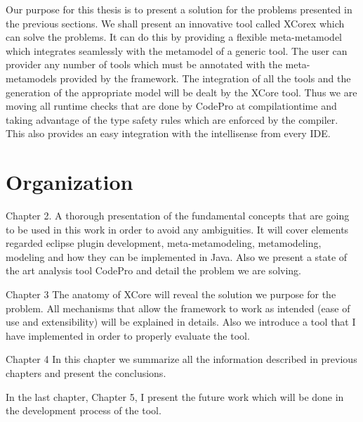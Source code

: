 	Our purpose for this thesis is to present a solution for the problems presented
in the previous sections.  We shall present an innovative tool called XCorex
which can solve the problems. It can do this by providing a flexible meta-metamodel 
which integrates seamlessly with the metamodel of a generic tool. The user can
provider any number of tools which must be annotated with the meta-metamodels 
provided by the framework. The integration of all the tools and
the generation of the appropriate model will be dealt by the XCore tool. Thus we
are moving all runtime checks that are done by CodePro at compilationtime and
taking advantage of the type safety rules which are enforced by the compiler. 
This also provides an easy integration with the intellisense from every IDE.

	
	


\section {Organization}
	Chapter 2.  A thorough presentation of the fundamental concepts that are going
to be used in this work in order to avoid any ambiguities.	It will cover
elements regarded eclipse plugin development, meta-metamodeling, metamodeling,
modeling and how they can be implemented in Java. Also we present a state of the
art analysis tool CodePro and detail the problem we are solving.

	Chapter 3  The anatomy of XCore will reveal the solution we purpose for the 
problem. All mechanisms that allow the framework to work as intended (ease of
use and extensibility) will be explained in details.  Also we introduce a tool
that I have implemented in order to properly evaluate the tool.
	
	Chapter 4  In this chapter we summarize all the information described in
previous chapters and present the conclusions.
	
	In the last chapter, Chapter 5, I present the future work which will be done
in the development process of the tool.	
	
